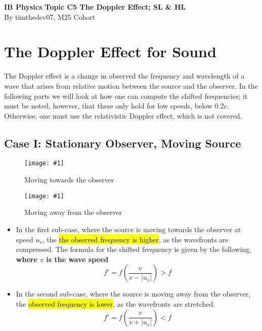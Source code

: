 \documentclass[a4paper,12pt]{article}
\let\oldsection\section
\renewcommand\section{\clearpage\oldsection}
\newcommand{\img}[4]{\begin{center}
  \begin{figure}[H]
    \centering
    \texttt{[image: \#1]}
    \caption{#3}
    \label{fig:#4}
  \end{figure}
\end{center}}
\newcommand{\paren}[1]{\left(#1\right)}
\begin{document}
\pagestyle{fancy}


\begin{titlepage}
  \begin{center}

    \vspace*{8cm}
    \textbf{\Large {IB Physics Topic C5 The Doppler Effect; SL \& HL}} \\
    \vspace*{1cm}
    \large{By timthedev07, M25 Cohort}


  \end{center}
\end{titlepage}

\pagebreak
\tableofcontents
\pagebreak

\clearpage
\setcounter{page}{1}

\section{The Doppler Effect for Sound}
The Doppler effect is a change in observed the frequency and wavelength of a wave that arises from relative motion between the source and the observer. In the following parts we will look at how one can compute the shifted frequencies; it must be noted, however, that these only hold for low speeds, below $0.2c$. Otherwise, one must use the relativistic Doppler effect, which is not covered.


\subsection{Case I: Stationary Observer, Moving Source}

\begin{minipage}{0.45\textwidth}
  \img{1A.png}{1}{Moving towards the observer}{1A}
\end{minipage}\hspace*{0.1\textwidth}%
\begin{minipage}{0.45\textwidth}
  \img{1B.png}{1}{Moving away from the observer}{1B}
\end{minipage}

\begin{itemize}
  \item In the first sub-case, where the source is moving towards the observer at speed $u_s$, the \hl{the observed frequency is higher}, as the wavefronts are compressed. The formula for the shifted frequency is given by the following, \textbf{where $v$ is the wave speed}
        \begin{equation}
          f' = f\paren{\frac{v}{v - |u_s|}} > f
        \end{equation}
  \item In the second sub-case, where the source is moving away from the observer, the \hl{observed frequency is lower}, as the wavefronts are stretched.
        \begin{equation}
          f' = f\paren{\frac{v}{v + |u_s|}} < f
        \end{equation}
\end{itemize}
\end{document}
